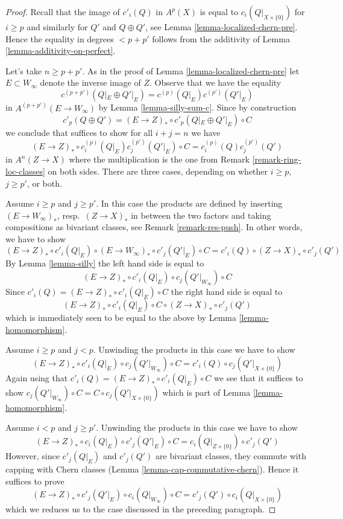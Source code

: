 \documentclass[10pt,a4paper]{amsart}
\theoremstyle{plain}
\theoremstyle{definition}
\theoremstyle{remark}
\numberwithin{equation}{subsection}
\begin{document}
\begin{proof}
Recall that the image of $c'_i(Q)$ in $A^p(X)$ is equal to
$c_i(Q|_{X \times \{0\}})$ for $i \geq p$ and similarly for
$Q'$ and $Q \oplus Q'$, see Lemma \ref{lemma-localized-chern-pre}.
Hence the equality in degrees $< p + p'$ follows from the
additivity of Lemma \ref{lemma-additivity-on-perfect}.

\medskip\noindent
Let's take $n \geq p + p'$.
As in the proof of Lemma \ref{lemma-localized-chern-pre}
let $E \subset W_\infty$ denote the inverse image of $Z$.
Observe that we have the equality
$$
c^{(p + p')}(Q|_E \oplus Q'|_E) =
c^{(p)}(Q|_E)c^{(p')}(Q'|_E)
$$
in $A^{(p + p')}(E \to W_\infty)$ by Lemma \ref{lemma-silly-sum-c}.
Since by construction
$$
c'_p(Q \oplus Q') = (E \to Z)_* \circ c'_p(Q|_E \oplus Q'|_E) \circ C
$$
we conclude that suffices to show for all $i + j = n$ we have
$$
(E \to Z)_* \circ c^{(p)}_i(Q|_E)c^{(p')}_j(Q'|_E) \circ C
=
c^{(p)}_i(Q)c^{(p')}_j(Q')
$$
in $A^n(Z \to X)$ where the multiplication is the one from
Remark \ref{remark-ring-loc-classes} on both sides. There are
three cases, depending on whether $i \geq p$, $j \geq p'$, or both.

\medskip\noindent
Assume $i \geq p$ and $j \geq p'$. In this case the products are
defined by inserting $(E \to W_\infty)_*$, resp.\ $(Z \to X)_*$ in between
the two factors and taking compositions as bivariant classes, see
Remark \ref{remark-res-push}.
In other words, we have to show
$$
(E \to Z)_* \circ c'_i(Q|_E) \circ
(E \to W_\infty)_* \circ c'_j(Q'|_E) \circ C =
c'_i(Q) \circ (Z \to X)_* \circ c'_j(Q')
$$
By Lemma \ref{lemma-silly} the left hand side is equal to
$$
(E \to Z)_* \circ c'_i(Q|_E) \circ c_j(Q'|_{W_\infty}) \circ C
$$
Since $c'_i(Q) = (E \to Z)_* \circ c'_i(Q|_E) \circ C$
the right hand side is equal to
$$
(E \to Z)_* \circ c'_i(Q|_E) \circ C \circ (Z \to X)_* \circ c'_j(Q')
$$
which is immediately seen to be equal to the above
by Lemma \ref{lemma-homomorphism}.

\medskip\noindent
Assume $i \geq p$ and $j < p$. Unwinding the products
in this case we have to show
$$
(E \to Z)_* \circ c'_i(Q|_E) \circ c_j(Q'|_{W_\infty}) \circ C =
c'_i(Q) \circ c_j(Q'|_{X \times \{0\}})
$$
Again using that $c'_i(Q) = (E \to Z)_* \circ c'_i(Q|_E) \circ C$
we see that it suffices to show $c_j(Q'|_{W_\infty}) \circ C =
C \circ c_j(Q'|_{X \times \{0\}})$ which is part of
Lemma \ref{lemma-homomorphism}.

\medskip\noindent
Assume $i < p$ and $j \geq p'$. Unwinding the products
in this case we have to show
$$
(E \to Z)_* \circ c_i(Q|_E) \circ c'_j(Q'|_E) \circ C =
c_i(Q|_{Z \times \{0\}}) \circ c'_j(Q')
$$
However, since $c'_j(Q|_E)$ and $c'_j(Q')$ are
bivariant classes, they commute with capping with Chern classes
(Lemma \ref{lemma-cap-commutative-chern}). Hence it suffices to prove
$$
(E \to Z)_* \circ c'_j(Q'|_E) \circ c_i(Q|_{W_\infty}) \circ C =
c'_j(Q') \circ c_i(Q|_{X \times \{0\}})
$$
which we reduces us to the case discussed in the preceding paragraph.
\end{proof}
\end{document}
